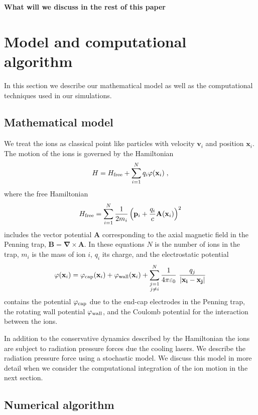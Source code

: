 \documentclass[aps, pra, preprint]{revtex4-1}
\newcommand{\hfree}{H_{\rm free}}
\newcommand{\phicap}{\varphi_{\rm cap}}
\newcommand{\phiwall}{\varphi_{\rm wall}}
\begin{document}
{\bf What will we discuss in the rest of this paper}


\section{Model and computational algorithm}

In this section we describe our mathematical model as well as the
computational techniques used in our simulations.


\subsection{Mathematical model}

We treat the ions as classical point like particles with 
velocity $\mathbf{v}_i$ and position $\mathbf{x}_i$. The motion
of the ions is governed by the Hamiltonian
\begin{equation}
  H = \hfree + \sum_{i=1}^N q_i\varphi(\mathbf{x}_i)\;,
\end{equation}
where the free Hamiltonian
\begin{equation}
  \hfree =
  \sum_{i=1}^N \frac{1}{2m_i}\left(
    \mathbf{p}_i +
    \frac{q_i}{c}\mathbf{A}(\mathbf{x}_i) \right)^2 
\end{equation}
includes the vector potential $\mathbf{A}$ corresponding to the
axial magnetic field in the Penning trap, $\mathbf{B} =
\mathbf{\nabla}\times \mathbf{A}$. In these equations $N$ is the
number of ions in the trap, $m_i$ is the mass of ion $i$, $q_i$
its charge, and the electrostatic potential
\begin{equation}
  \varphi(\mathbf{x}_i) =
  \phicap(\mathbf{x}_i) +
  \phiwall(\mathbf{x}_i) +
  \sum_{\substack{j=1\\j\neq i}}^N
  \frac{1}{4\pi\varepsilon_0}\
  \frac{q_j}{\left| \mathbf{x_i} - \mathbf{x_j} \right|}
\end{equation}
contains the potential $\phicap$ due to the end-cap electrodes in
the Penning trap, the rotating wall potential $\phiwall$, and the
Coulomb potential for the interaction between the ions.

In addition to the conservative dynamics described by the
Hamiltonian the ions are subject to radiation pressure forces due
the cooling lasers. We describe the radiation pressure force
using a stochastic model. We discuss this model in more detail
when we consider the computational integration of the ion motion
in the next section.


\subsection{Numerical algorithm}
\end{document}
